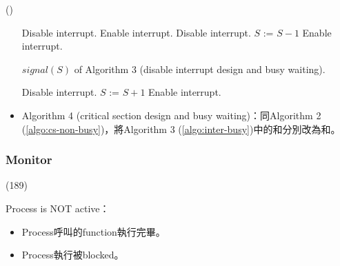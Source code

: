 \begin{theorem}{()}
\begin{itemize}
\begin{algorithm}[H]
\begin{algorithmic}[1]
                    \State Disable interrupt.
                        \State Enable interrupt.
                        \State Disable interrupt.
                    \EndWhile
                    \State $S$ := $S - 1$ 
                    \State Enable interrupt.
                \EndFunction
            \end{algorithmic}
        \end{algorithm}
        \begin{algorithm}[H]
            \caption{$signal(S)$ of Algorithm 3 (disable interrupt design and busy waiting).}
            \begin{algorithmic}[1]
                    \State Disable interrupt.
                    \State $S$ := $S + 1$
                    \State Enable interrupt.
                \EndFunction
            \end{algorithmic}
        \end{algorithm}
        \item Algorithm 4 (critical section design and busy waiting)：同Algorithm 2 (\ref{algo:cs-non-busy})，將Algorithm 3 (\ref{algo:inter-busy})中的和分別改為和。
    \end{itemize}
\end{theorem}

\subsubsection{Monitor}

\begin{theorem}{(189)} 
    \item Process is NOT active：\begin{itemize}
        \item Process呼叫的function執行完畢。
        \item Process執行被blocked。
    \end{itemize}
\end{theorem}

